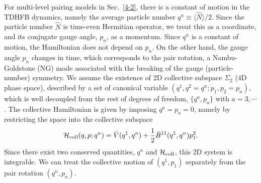 \documentclass[11pt]{book} %
\begin{document}
For multi-level pairing models in Sec.~\ref{4-2}, 
there is a constant of motion in the TDHFB dynamics,
namely the average particle number $q^n\equiv \langle \hat{N} \rangle/2$.
Since the particle number $\hat{N}$ is time-even Hermitian operator, we treat
this as a coordinate, and its conjugate gauge angle, $p_n$,
as a momentum.
Since $q^n$ is a constant of motion, the Hamiltonian does not
depend on $p_n$.
On the other hand, the gauge angle $p_n$ changes in time,
which corresponds to the pair rotation, a Nambu-Goldstone (NG) mode
associated with the breaking of the gauge (particle-number) symmetry.
We assume the existence of 2D collective subspace $\Sigma_2$
(4D phase space),
described by a set of canonical variable $(q^1,q^2=q^n;p_1,p_2=p_n)$,
which is well decoupled from the rest of degrees of freedom,
$\{q^a,p_a\}$ with $a=3,\cdots$.
The collective Hamiltonian is given by imposing $q^a=p_a=0$,
namely by restricting the space into the collective subspace
\begin{equation}
\mathcal{H}_{\rm coll}(q,p;q^n)
= \bar{V}(q^1,q^n) + \frac{1}{2}\bar{B}^{11}(q^1,q^n)p_1^2 .
  \label{coll}
\end{equation}
Since there exist two conserved quantities, $q^n$ and $\mathcal{H}_{\rm coll}$,
this 2D system is integrable.
We can treat the collective motion of $(q^1,p_1)$ separately from
the pair rotation $(q^n, p_n)$.
\end{document}
